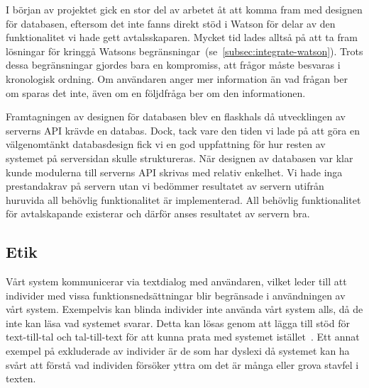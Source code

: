 \documentclass[a4paper,12pt]{article}
\begin{document}
I början av projektet gick en stor del av arbetet åt att komma fram med designen för databasen, eftersom det inte fanns direkt stöd i Watson för delar av den funktionalitet vi hade gett avtalsskaparen. Mycket tid lades alltså på att ta fram lösningar för kringgå Watsons begränsningar~(se~\ref{subsec:integrate-watson}). Trots dessa begränsningar gjordes bara en kompromiss, att frågor måste besvaras i kronologisk ordning. Om användaren anger mer information än vad frågan ber om sparas det inte, även om en följdfråga ber om den informationen.

Framtagningen av designen för databasen blev en flaskhals då utvecklingen av serverns API krävde en databas. Dock, tack vare den tiden vi lade på att göra en välgenomtänkt databasdesign fick vi en god uppfattning för hur resten av systemet på serversidan skulle struktureras. När designen av databasen var klar kunde modulerna till serverns API skrivas med relativ enkelhet. Vi hade inga prestandakrav på servern utan vi bedömmer resultatet av servern utifrån huruvida all behövlig funktionalitet är implementerad. All behövlig funktionalitet för avtalskapande existerar och därför anses resultatet av servern bra.
 

\subsection{Etik}
Vårt system kommunicerar via textdialog med användaren, vilket leder till att individer med vissa funktionsnedsättningar blir begränsade i användningen av vårt system. Exempelvis kan blinda individer inte använda vårt system alls, då de inte kan läsa vad systemet svarar. Detta kan lösas genom att lägga till stöd för text-till-tal och tal-till-text för att kunna prata med systemet istället~\cite{web:srf-IT}. Ett annat exempel på exkluderade av individer är de som har dyslexi då systemet kan ha svårt att förstå vad individen försöker yttra om det är många eller grova stavfel i texten.
\end{document}
